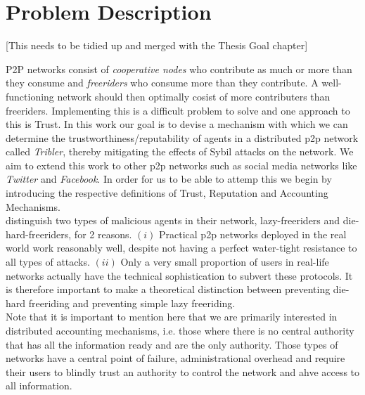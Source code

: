 \documentclass[11pt,a4paper]{article}
\theoremstyle{definition}
\theoremstyle{theorem}
\theoremstyle{proposition}
\theoremstyle{corollary}
\theoremstyle{lemma}
\theoremstyle{example}
\theoremstyle{remark}
\begin{document}
\section{Problem Description}
\label{sec:Problem Description}
\noindent{} \begin{center} [This needs to be tidied up and merged with the Thesis Goal chapter] \vspace{1em}\\ \end{center}
\noindent{}P2P networks consist of {\it cooperative nodes} who contribute as much or more than they consume and {\it freeriders} who consume more than they contribute. A well-functioning network should then optimally cosist of more contributers than freeriders. Implementing this is a difficult problem to solve and one approach to this is Trust. In this work our goal is to devise a mechanism with which we can determine the trustworthiness/reputability of agents in a distributed p2p network called {\it Tribler}, thereby mitigating the effects of Sybil attacks on the network. We aim to extend this work to other p2p networks such as social media networks like {\it Twitter} and {\it Facebook}. In order for us to be able to attemp this we begin by introducing the respective definitions of Trust, Reputation and Accounting Mechanisms. \vspace{1em}\\

\noindent{}\cite{Bartercast: A Practical Approach to Prevent Lazy Freeriding in P2P Networks} distinguish two types of malicious agents in their network, lazy-freeriders and die-hard-freeriders, for 2 reasons. $(i)$ Practical p2p networks deployed in the real world work reasonably well, despite not having a perfect water-tight resistance to all types of attacks. $(ii)$ Only a very small proportion of users in real-life networks actually have the technical sophistication to subvert these protocols. It is therefore important to make a theoretical distinction between preventing die-hard freeriding and preventing simple lazy freeriding. \vspace{1em}\\

\noindent{}Note that it is important to mention here that we are primarily interested in distributed accounting mechanisms, i.e. those where there is no central authority that has all the information ready and are the only authority. Those types of networks have a central point of failure, administrational overhead and require their users to blindly trust an authority to control the network and ahve access to all information. \vspace{1em}\\  
\end{document}
